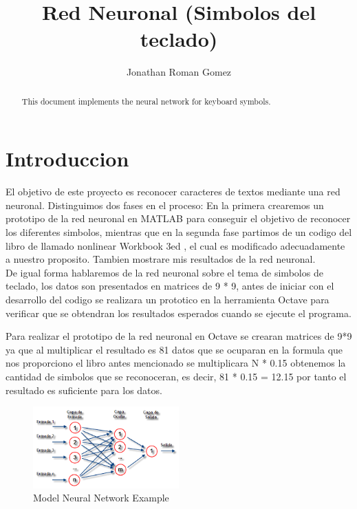 \documentclass[10pt]{article}         %
\title{Red Neuronal (Simbolos del teclado)}
\author{Jonathan Roman Gomez}
\begin{document}
\maketitle

\begin{abstract}
This document implements the neural network for keyboard symbols.
\end{abstract}

\section{Introduccion}

El objetivo de este proyecto es reconocer caracteres de textos mediante una red neuronal. Distinguimos dos fases en el proceso: En la primera crearemos un prototipo de la red neuronal en MATLAB para conseguir el objetivo de reconocer los diferentes simbolos, mientras que en la segunda fase partimos de un codigo del libro de llamado nonlinear Workbook 3ed , el cual es modificado adecuadamente a nuestro proposito. Tambien mostrare mis resultados de la red neuronal.
\\De igual forma hablaremos de la red neuronal sobre el tema de simbolos de teclado, los datos son presentados en matrices de 9 * 9, antes de iniciar con el desarrollo del codigo se realizara un prototico en la herramienta Octave para verificar que se obtendran los resultados esperados cuando se ejecute el programa.

Para realizar el prototipo de la red neuronal en Octave se crearan matrices de 9*9 ya que al multiplicar el resultado es 81 datos que se ocuparan en la formula que nos proporciono el libro antes mencionado se multiplicara N * 0.15 obtenemos la cantidad de simbolos que se reconoceran, es decir, 81 * 0.15 = 12.15 por tanto el resultado es suficiente para los datos.

\begin{figure}[htb]
\centering
\includegraphics[width=0.5\textwidth]{red neuronal.png}
\caption{Model Neural Network Example}
\label{fig:tigre}
\end{figure}
\end{document}
